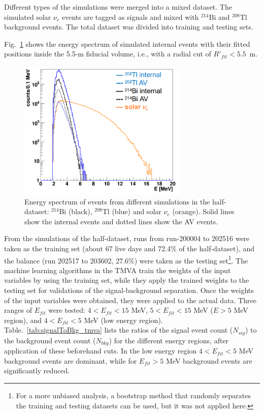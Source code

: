 Different types of the simulations were merged into a mixed dataset. The simulated solar $\nu_e$ events are tagged as signals and mixed with $^{214}$Bi and $^{208}$Tl background events. The total dataset was divided into training and testing sets. 

Fig.~\ref{TMVA_bkgs_1} shows the energy spectrum of simulated internal events with their fitted positions inside the 5.5-m fiducial volume, i.e., with a radial cut of $R'_{fit}<5.5$~m.

\begin{figure}[!htb]
	\centering
	\includegraphics[width=8cm]{TMVA_bkgs_1.png}
	\caption[Energy spectrum of events from different simulations.]{Energy spectrum of events from different simulations in the half-dataset: $^{214}$Bi (black), $^{208}$Tl (blue) and solar $\nu_e$ (orange). Solid lines show the internal events and dotted lines show the AV events.	\label{TMVA_bkgs_1}}

\end{figure}

From the simulations of the half-dataset, runs from run-200004 to 202516 were taken as the training set (about 67 live days and 72.4\% of the half-dataset), and the balance (run 202517 to 203602, 27.6\%) were taken as the testing set\footnote{For a more unbiased analysis, a bootstrap method \cite{murphy2012machine} that randomly separates the training and testing datasets can be used, but it was not applied here.}. The machine learning algorithms in the TMVA train the weights of the input variables by using the training set, while they apply the trained weights to the testing set for validations of the signal-background separation. Once the weights of the input variables were obtained, they were applied to the actual data. Three ranges of $E_{fit}$ were tested: $4<E_{fit}<15$ MeV, $5<E_{fit}<15$ MeV ($E>5$ MeV region), and $4<E_{fit}<5$ MeV (low energy region). Table.~\ref{tab:signalToBkg_tmva} lists the ratios of the signal event count ($N_{sig}$) to the background event count ($N_{bkg}$) for the different energy regions, after application of these beforehand cuts. In the low energy region $4<E_{fit}<5$ MeV background events are dominant, while for  $E_{fit}>5$ MeV background events are significantly reduced.

